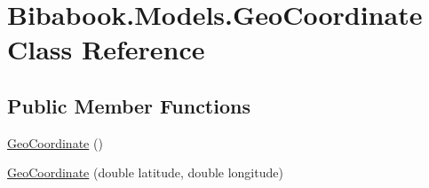\hypertarget{class_bibabook_1_1_models_1_1_geo_coordinate}{}\section{Bibabook.\+Models.\+Geo\+Coordinate Class Reference}
\label{class_bibabook_1_1_models_1_1_geo_coordinate}
\subsection*{Public Member Functions}
\begin{DoxyCompactItemize}
\item 
\hyperlink{class_bibabook_1_1_models_1_1_geo_coordinate_ada930087e98619c7d3720fa3264725ef}{Geo\+Coordinate} ()
\item 
\hyperlink{class_bibabook_1_1_models_1_1_geo_coordinate_a69f70783a1dc9dfb08df0f8f5d948e16}{Geo\+Coordinate} (double latitude, double longitude)
\end{DoxyCompactItemize}
